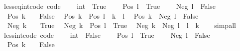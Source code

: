 \begin{isabellebody}
\ less{\isacharunderscore}{\kern0pt}eq{\isacharunderscore}{\kern0pt}int{\isacharunderscore}{\kern0pt}code\ {\isacharbrackleft}{\kern0pt}code{\isacharbrackright}{\kern0pt}{\isacharcolon}{\kern0pt}\isanewline
\ \ {\isachardoublequoteopen}{}\ {\isasymle}\ {\isacharparenleft}{\kern0pt}{}{\isacharcolon}{\kern0pt}{\isacharcolon}{\kern0pt}int{\isacharparenright}{\kern0pt}\ {\isasymlongleftrightarrow}\ True{\isachardoublequoteclose}\isanewline
\ \ {\isachardoublequoteopen}{}\ {\isasymle}\ Pos\ l\ {\isasymlongleftrightarrow}\ True{\isachardoublequoteclose}\isanewline
\ \ {\isachardoublequoteopen}{}\ {\isasymle}\ Neg\ l\ {\isasymlongleftrightarrow}\ False{\isachardoublequoteclose}\isanewline
\ \ {\isachardoublequoteopen}Pos\ k\ {\isasymle}\ {}\ {\isasymlongleftrightarrow}\ False{\isachardoublequoteclose}\isanewline
\ \ {\isachardoublequoteopen}Pos\ k\ {\isasymle}\ Pos\ l\ {\isasymlongleftrightarrow}\ k\ {\isasymle}\ l{\isachardoublequoteclose}\isanewline
\ \ {\isachardoublequoteopen}Pos\ k\ {\isasymle}\ Neg\ l\ {\isasymlongleftrightarrow}\ False{\isachardoublequoteclose}\isanewline
\ \ {\isachardoublequoteopen}Neg\ k\ {\isasymle}\ {}\ {\isasymlongleftrightarrow}\ True{\isachardoublequoteclose}\isanewline
\ \ {\isachardoublequoteopen}Neg\ k\ {\isasymle}\ Pos\ l\ {\isasymlongleftrightarrow}\ True{\isachardoublequoteclose}\isanewline
\ \ {\isachardoublequoteopen}Neg\ k\ {\isasymle}\ Neg\ l\ {\isasymlongleftrightarrow}\ l\ {\isasymle}\ k{\isachardoublequoteclose}\isanewline
%
\isadelimproof
\ \ %
\endisadelimproof
%
\isatagproof
{}\isamarkupfalse%
\ simp{\isacharunderscore}{\kern0pt}all%
\endisatagproof
{\isafoldproof}%
%
\isadelimproof
\isanewline
%
\endisadelimproof
\isanewline
{}\isamarkupfalse%
\ less{\isacharunderscore}{\kern0pt}int{\isacharunderscore}{\kern0pt}code\ {\isacharbrackleft}{\kern0pt}code{\isacharbrackright}{\kern0pt}{\isacharcolon}{\kern0pt}\isanewline
\ \ {\isachardoublequoteopen}{}\ {\isacharless}{\kern0pt}\ {\isacharparenleft}{\kern0pt}{}{\isacharcolon}{\kern0pt}{\isacharcolon}{\kern0pt}int{\isacharparenright}{\kern0pt}\ {\isasymlongleftrightarrow}\ False{\isachardoublequoteclose}\isanewline
\ \ {\isachardoublequoteopen}{}\ {\isacharless}{\kern0pt}\ Pos\ l\ {\isasymlongleftrightarrow}\ True{\isachardoublequoteclose}\isanewline
\ \ {\isachardoublequoteopen}{}\ {\isacharless}{\kern0pt}\ Neg\ l\ {\isasymlongleftrightarrow}\ False{\isachardoublequoteclose}\isanewline
\ \ {\isachardoublequoteopen}Pos\ k\ {\isacharless}{\kern0pt}\ {}\ {\isasymlongleftrightarrow}\ False{\isachardoublequoteclose}\isanewline

\end{isabellebody}

